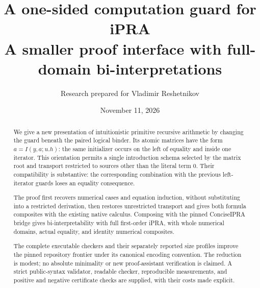 \documentclass[11pt]{article}
\title{\textbf{A one-sided computation guard for iPRA}\\[6pt]\large A smaller proof interface with full-domain bi-interpretations}
\author{Research prepared for Vladimir Reshetnikov}
\date{November 11, 2026}
\theoremstyle{definition}\newtheorem{definition}[theorem]{Definition}
\begin{document}
\maketitle
\begin{abstract}
We give a new presentation of intuitionistic primitive recursive arithmetic
by changing the guard beneath the paired logical binder.  Its atomic
matrices have the form $a=I(y,a;u.h)$: the same initializer occurs on the
left of equality and inside one iterator.  This orientation permits a
single introduction schema selected by the matrix root and transport
restricted to sources other than the literal term $0$.  Their compatibility
is substantive: the corresponding combination with the previous
left-iterator guards loses an equality consequence.

The proof first recovers numerical cases and equation induction, without
substituting into a restricted derivation, then restores unrestricted
transport and gives both formula composites with the existing native
calculus.  Composing with the pinned ConciseIPRA bridge gives
bi-interpretability with full first-order iPRA, with whole numerical
domains, actual equality, and identity numerical composites.

The complete executable checkers and their separately reported size
profiles improve the pinned repository frontier under its canonical
encoding convention.  The reduction is modest; no absolute minimality or
new proof-assistant verification is claimed.  A strict public-syntax
validator, readable checker, reproducible measurements, and positive and
negative certificate checks are supplied, with their costs made explicit.
\end{abstract}
\clearpage
\setcounter{tocdepth}{2}
\tableofcontents
\newpage







\appendix
\end{document}
